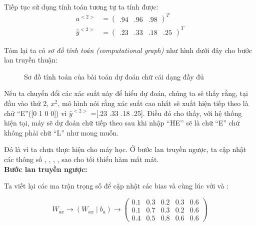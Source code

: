 Tiếp tục sử dụng tính toán tương tự ta tính được: 
\begin{equation*} 
    \begin{split}
    a^{<2>} & =  \begin{pmatrix}.94 & .96 &.98 \end{pmatrix}^{T} \\
    \widehat{y}^{<2>} & = \begin{pmatrix}.23 & .33 & .18 & .25 \end{pmatrix}^{T} 
    \end{split}
\end{equation*}

Tóm lại ta có \textit{sơ đồ tính toán (computational graph)} như hình dưới đây cho bước lan truyền thuận:
\begin{figure}[!h]
    \begin{center}
        
    \end{center}
    \caption{Sơ đồ tính toán của bài toán dự đoán chữ cái dạng đầy đủ}
\end{figure}

Nếu ta chuyển đổi các xác suất này để hiểu dự đoán, chúng ta sẽ thấy rằng, tại đầu vào thứ 2, $x^{2}$, mô hình nói rằng xác suất cao nhất sẽ xuất hiện tiếp theo là chữ ``E''([0 1 0 0]) vì $\hat{y}^{<2>}$ =[.23  .33  .18  .25]. Điều đó cho thấy, với hệ thống hiện tại, máy sẽ dự đoán chữ tiếp theo sau khi nhập ``HE'’ sẽ là chữ ``E'' chứ không phải chữ ``L'' như mong muốn. 

Đó là vì ta chưa thực hiện cho máy học. Ở bước lan truyền ngược, ta cập nhật các thông số \wax, \waa, \wya, \ba, \by \space sao cho tối thiểu hàm mất mát.\\

\textbf{Bước lan truyền ngược:}

Ta viết lại các ma trận trọng số để cập nhật các bias \ba và \by cùng lúc với \wax và \wya:

\begin{equation*}
W_{ax} \longrightarrow (W_{ax} \mid b_a) \longrightarrow \begin{pmatrix} 0.1 & 0.3 & 0.2 & 0.3 & 0.6\\0.1 & 0.7 & 0.3 & 0.2 & 0.6\\0.4 & 0.5 & 0.8 & 0.6 & 0.6 \end{pmatrix}
\end{equation*}

